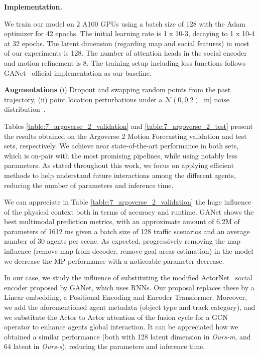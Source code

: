 \noindent\textbf{Implementation.}

We train our model on 2 A100 GPUs using a batch size of 128 with the Adam optimizer for 42 epochs. The initial learning rate is 1 x 10-3, decaying to 1 x 10-4 at 32 epochs. The latent dimension (regarding map and social features) in most of our experiments is 128. The number of attention heads in the social encoder and motion refinement is 8. The training setup including loss functions follows GANet~\cite{wang2022ganet} official implementation as our baseline.

\noindent\textbf{Augmentations}  (i) Dropout and swapping random points from the past trajectory, (ii) point location perturbations under a $\mathcal{N}(0, 0.2)$ [m] noise distribution~\cite{ye2021tpcn}.

Tables \ref{table:7_argoverse_2_validation} and \ref{table:7_argoverse_2_test} present the results obtained on the Argoverse 2 Motion Forecasting validation and test sets, respectively. We achieve near state-of-the-art performance in both sets, which is on-pair with the most promising pipelines, while using notably less parameters. As stated throughout this work, we focus on applying efficient methods to help understand future interactions among the different agents, reducing the number of parameters and inference time. 

We can appreciate in Table \ref{table:7_argoverse_2_validation} the huge influence of the physical context both in terms of accuracy and runtime. GANet \cite{wang2022ganet} shows the best multimodal prediction metrics, with an approximate amount of 6.2M of parameters of 1612 ms given a batch size of 128 traffic scenarios and an average number of 30 agents per scene. As expected, progressively removing the map influence (remove map from decoder, remove goal areas estimation) in the model we decrease the MP performance with a noticeable parameter decrease. 


In our case, we study the influence of substituting the modified ActorNet~\cite{wang2022ganet, liang2020learning} social encoder proposed by GANet, which uses RNNs. Our proposal replaces these by a Linear embedding, a Positional Encoding and Encoder Transformer. Moreover, we add the aforementioned agent metadata (object type and track category), and we substitute the Actor to Actor attention of the fusion cycle for a GCN~\cite{schmidt2022crat} operator to enhance agents global interaction. 
%
It can be appreciated how we obtained a similar performance (both with 128 latent dimension in \textit{Ours-m}, and 64 latent in \textit{Ours-s}), reducing the parameters and inference time. 

